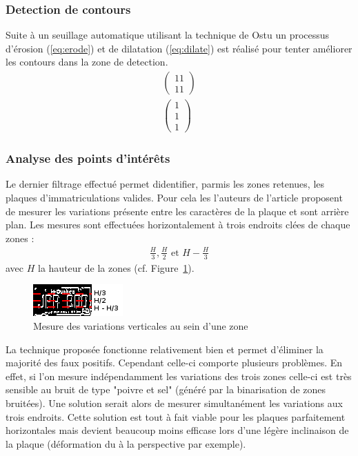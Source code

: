 \documentclass[a4paper,10pt,twocolumn]{article}
\begin{document}
\subsubsection{Detection de contours}
Suite à un seuillage automatique utilisant la technique de Ostu\cite{otsu79} un processus d'érosion (\ref{eq:erode}) et de dilatation (\ref{eq:dilate}) est réalisé pour tenter améliorer les contours dans la zone de detection.
\begin{gather}
  \label{eq:erode}
  \left( \begin{array}{c} 
    1 1\\
    1 1
  \end{array} \right)\\
  \label{eq:dilate}
  \left( \begin{array}{c} 
    1\\
    1\\
    1 
  \end{array} \right)
\end{gather}

\subsubsection{Analyse des points d'intérêts}
Le dernier filtrage effectué permet didentifier, parmis les zones retenues, les plaques d'immatriculations valides. Pour cela les l'auteurs de l'article proposent de mesurer les variations présente entre les caractères de la plaque et sont arrière plan. Les mesures sont effectuées horizontalement à trois endroits clées de chaque zones :
\begin{align*}
  \frac{H}{3}, \frac{H}{2}\text{ et }H - \frac{H}{3}
\end{align*}
avec $H$ la hauteur de la zones (cf. Figure~\ref{plate_bin}).
\begin{figure}[H]
	\centering 
	  \includegraphics{img/plate_bin.png}
	\caption{Mesure des variations verticales au sein d'une zone\label{plate_bin}}
\end{figure}
La technique proposée fonctionne relativement bien et permet d'éliminer la majorité des faux positifs. Cependant celle-ci comporte plusieurs problèmes. En effet, si l'on mesure indépendamment les variations des trois zones celle-ci est très sensible au bruit de type "poivre et sel" (généré par la binarisation de zones bruitées). Une solution serait alors de mesurer simultanément les variations aux trois endroits. Cette solution est tout à fait viable pour les plaques parfaitement horizontales mais devient beaucoup moins efficase lors d'une légère inclinaison de la plaque (déformation du à la perspective par exemple). 
\end{document}
